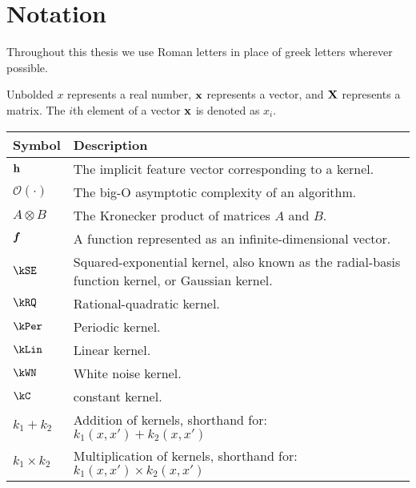 
\inbpdocument

\chapter*{Notation}
\label{ch:notation}

Throughout this thesis we use Roman letters in place of greek letters wherever possible.

Unbolded $x$ represents a real number, ${\bf{x}}$ represents a vector, and $\mathbf{X}$ represents a matrix.
The $i$th element of a vector ${\bf{x}}$ is denoted as $x_i$.

\begin{tabular}{ll}
Symbol \quad     & Description \\
\hline
${\bf{h}}$       & The implicit feature vector corresponding to a kernel. \\
$\mathcal{O}(\cdot)$ & The big-O asymptotic complexity of an algorithm. \\
$A \otimes B$ & The Kronecker product of matrices $A$ and $B$. \\
$\boldsymbol{f}$ & A function represented as an infinite-dimensional vector. \\
$\kSE$ & Squared-exponential kernel, also known as the radial-basis function kernel, or Gaussian kernel. \\
$\kRQ$ & Rational-quadratic kernel. \\
$\kPer$ & Periodic kernel. \\
$\kLin$ & Linear kernel. \\
$\kWN$ & White noise kernel. \\
$\kC$ & constant kernel. \\
$k_1 + k_2$ & Addition of kernels, shorthand for: $k_1(x,x') + k_2(x,x')$ \\
$k_1 \times k_2$& Multiplication of kernels, shorthand for: $k_1(x,x') \times k_2(x,x')$ \\
\end{tabular}

\outbpdocument{
}


